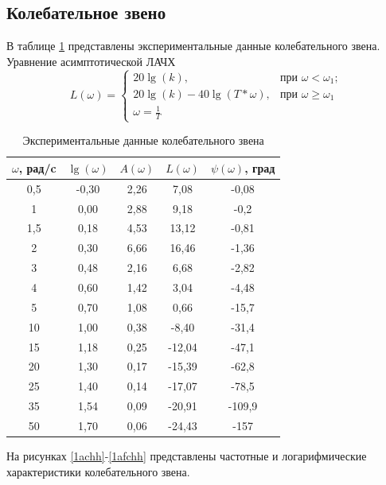 \documentclass[a4paper, 12pt]{article}
\begin{document}
\newpage		
		
\begin{center}
	\section{Колебательное звено}
\end{center}\par

В таблице \ref{tab:coleb} представлены экспериментальные данные колебательного звена.
Уравнение асимптотической ЛАЧХ
\begin{equation}
	L(\omega) = \begin{cases}
					20\lg(k), & \mbox{при } \omega<\omega_1;\\
					20\lg(k)-40\lg(T*\omega), & \mbox{при } \omega \geq \omega_1\\
					\omega = \frac{1}{T}
				\end{cases}
\end{equation}
		
\begin{table}[h!]
	\centering
	
	\begin{threeparttable}
	\caption{Экспериментальные данные колебательного звена}
	\label{tab:coleb}	
	\begin{tabular}{|c|c|c|c|c|}
		\hline
		$\omega$, рад/c   & $\lg(\omega)$   & $A(\omega)$ & $L(\omega)$  & $\psi(\omega)$, град   \\
		\hline
		0,5 & -0,30 & 2,26 & 7,08   & -0,08  \\
		\hline
		1   & 0,00  & 2,88 & 9,18  & -0,2   \\
		\hline
		1,5 & 0,18  & 4,53 & 13,12 & -0,81  \\
		\hline
		2   & 0,30  & 6,66 & 16,46 & -1,36  \\
		\hline
		3   & 0,48  & 2,16 & 6,68 & -2,82  \\
		\hline
		4   & 0,60  & 1,42 & 3,04 & -4,48  \\
		\hline
		5   & 0,70  & 1,08 & 0,66     & -15,7  \\
		\hline
		10  & 1,00  & 0,38 & -8,40   & -31,4  \\
		\hline
		15  & 1,18  & 0,25 & -12,04  & -47,1  \\
		\hline
		20  & 1,30  & 0,17 & -15,39  & -62,8  \\
		\hline
		25  & 1,40  & 0,14 & -17,07  & -78,5  \\
		\hline
		35  & 1,54  & 0,09 & -20,91  & -109,9 \\
		\hline
		50  & 1,70  & 0,06 & -24,43  & -157  \\
		\hline
	\end{tabular}
\end{threeparttable}
\end{table}
На рисунках \ref{1achh}-\ref{1afchh} представлены частотные и логарифмические характеристики колебательного звена.
\newpage
\end{document}
